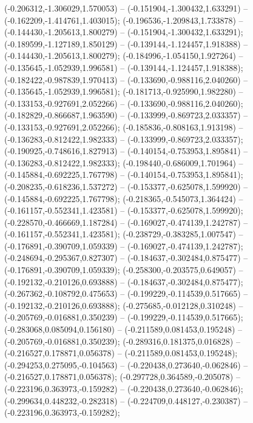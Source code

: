  (-0.206312,-1.306029,1.570053) -- (-0.151904,-1.300432,1.633291) -- (-0.162209,-1.414761,1.403015);
 (-0.196536,-1.209843,1.733878) -- (-0.144430,-1.205613,1.800279) -- (-0.151904,-1.300432,1.633291);
 (-0.189599,-1.127189,1.850129) -- (-0.139144,-1.124457,1.918388) -- (-0.144430,-1.205613,1.800279);
 (-0.184996,-1.054150,1.927264) -- (-0.135645,-1.052939,1.996581) -- (-0.139144,-1.124457,1.918388);
 (-0.182422,-0.987839,1.970413) -- (-0.133690,-0.988116,2.040260) -- (-0.135645,-1.052939,1.996581);
 (-0.181713,-0.925990,1.982280) -- (-0.133153,-0.927691,2.052266) -- (-0.133690,-0.988116,2.040260);
 (-0.182829,-0.866687,1.963590) -- (-0.133999,-0.869723,2.033357) -- (-0.133153,-0.927691,2.052266);
 (-0.185836,-0.808163,1.913198) -- (-0.136283,-0.812422,1.982333) -- (-0.133999,-0.869723,2.033357);
 (-0.190925,-0.748616,1.827913) -- (-0.140154,-0.753953,1.895841) -- (-0.136283,-0.812422,1.982333);
 (-0.198440,-0.686009,1.701964) -- (-0.145884,-0.692225,1.767798) -- (-0.140154,-0.753953,1.895841);
 (-0.208235,-0.618236,1.537272) -- (-0.153377,-0.625078,1.599920) -- (-0.145884,-0.692225,1.767798);
 (-0.218365,-0.545073,1.364424) -- (-0.161157,-0.552341,1.423581) -- (-0.153377,-0.625078,1.599920);
 (-0.228570,-0.466669,1.187284) -- (-0.169027,-0.474139,1.242787) -- (-0.161157,-0.552341,1.423581);
 (-0.238729,-0.383285,1.007547) -- (-0.176891,-0.390709,1.059339) -- (-0.169027,-0.474139,1.242787);
 (-0.248694,-0.295367,0.827307) -- (-0.184637,-0.302484,0.875477) -- (-0.176891,-0.390709,1.059339);
 (-0.258300,-0.203575,0.649057) -- (-0.192132,-0.210126,0.693888) -- (-0.184637,-0.302484,0.875477);
 (-0.267362,-0.108792,0.475653) -- (-0.199229,-0.114539,0.517665) -- (-0.192132,-0.210126,0.693888);
 (-0.275685,-0.012128,0.310248) -- (-0.205769,-0.016881,0.350239) -- (-0.199229,-0.114539,0.517665);
 (-0.283068,0.085094,0.156180) -- (-0.211589,0.081453,0.195248) -- (-0.205769,-0.016881,0.350239);
 (-0.289316,0.181375,0.016828) -- (-0.216527,0.178871,0.056378) -- (-0.211589,0.081453,0.195248);
 (-0.294253,0.275095,-0.104563) -- (-0.220438,0.273640,-0.062846) -- (-0.216527,0.178871,0.056378);
 (-0.297728,0.364589,-0.205078) -- (-0.223196,0.363973,-0.159282) -- (-0.220438,0.273640,-0.062846);
 (-0.299634,0.448232,-0.282318) -- (-0.224709,0.448127,-0.230387) -- (-0.223196,0.363973,-0.159282);

